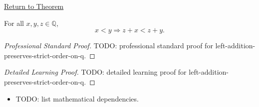\newpage
{}
\label{prf:left-addition-preserves-strict-order-on-q}

\begin{remark*}[Return]
\hyperref[thm:left-addition-preserves-strict-order-on-q]{Return to Theorem}
\end{remark*}

\begin{theorem*}
For all $x,y,z\in\mathbb{Q}$,
\[
x<y \Longrightarrow z+x<z+y.
\]
\end{theorem*}

\begin{proof}[Professional Standard Proof]
\LRAProofBodyStart
TODO: professional standard proof for left-addition-preserves-strict-order-on-q.
\end{proof}

\begin{proof}[Detailed Learning Proof]
\LRAProofBodyStart
TODO: detailed learning proof for left-addition-preserves-strict-order-on-q.
\end{proof}

\begin{remark*}
\end{remark*}

\begin{dependencies}
\begin{itemize}
  \item TODO: list mathematical dependencies.
\end{itemize}
\end{dependencies}

\clearpage

